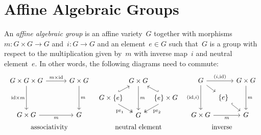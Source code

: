 \section{Affine Algebraic Groups}


\begin{definition}
  An \emph{affine algebraic group} is an affine variety~$G$ together with morphisms~$m \colon G \times G \to G$ and~$i \colon G \to G$ and an element~$e \in G$ such that~$G$ is a group with respect to the multiplication given by~$m$ with inverse map~$i$ and neutral element~$e$.
  In other words, the following diagrams need to commute:
  \[
    \renewcommand{\arraystretch}{1.5}
    \renewcommand{\arraycolsep}{3.3pt}
    \begin{array}{ccc}
        \begin{tikzcd}[column sep = 30pt, row sep = 35pt]
            G \times G \times G
            \arrow{r}[above]{m \times {\id}}
            \arrow{d}[left]{{\id} \times m}
          & G \times G
            \arrow{d}[right]{m}
          \\
            G \times G
            \arrow{r}[below]{m}
          & G
        \end{tikzcd}
      &
        \begin{tikzcd}[column sep = 10pt, row sep = 9pt]
            {}
          & G \times G
            \arrow{dd}[right]{m}
          & {}
          \\
            G \times \{e\} \hspace{-10pt}
            \arrow[hook]{ur}
            \arrow[two heads]{dr}[below left]{\operatorname{pr}_1}
          & {}
          & \hspace{-10pt} \{e\} \times G
            \arrow[hook']{ul}
            \arrow[two heads]{dl}[below right]{\operatorname{pr}_2}
          \\
            {}
          & G
          & {}
        \end{tikzcd}
      &
        \begin{tikzcd}[column sep = 3pt, row sep = 9pt]
            G
            \arrow{rr}[above]{(i,\id)}
            \arrow{dd}[left]{(\id,i)}
            \arrow{dr}
          & {}
          & G \times G
            \arrow{dd}[right]{m}
          \\
            {}
          & \{e\}
            \arrow[hook]{dr}
          & {}
          \\
            G \times G
            \arrow{rr}[below]{m}
          & {}
          & G
        \end{tikzcd}
    \\
        \text{associativity}
      & \text{neutral element}
      & \text{inverse}
    \end{array}
  \]
\end{definition}


